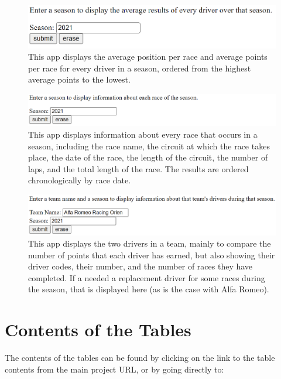 \documentclass{article} %
\begin{document}
\begin{figure}[H]
    \centering
    \includegraphics[scale=0.35]{6.PNG}
    \caption{This app displays the average position per race and average
    points per race for every driver in a season, ordered from the highest
    average points to the lowest.}
\end{figure}
\begin{figure}[H]
    \centering
    \includegraphics[scale=0.35]{7.PNG}
    \caption{This app displays information about every race that occurs
    in a season, including the race name, the circuit at which the race
    takes place, the date of the race, the length of the circuit, the
    number of laps, and the total length of the race. The results are
    ordered chronologically by race date.}
\end{figure}
\begin{figure}[H]
    \centering
    \includegraphics[scale=0.35]{8.PNG}
    \caption{This app displays the two drivers in a team, mainly to
    compare the number of points that each driver has earned, but also
    showing their driver codes, their number, and the number of races
    they have completed. If a needed a replacement driver for some races
    during the season, that is displayed here (as is the case with Alfa Romeo).}
\end{figure}


\section{Contents of the Tables}

The contents of the tables can be found by clicking on the link to the
table contents from the main project URL, or by going directly to:
\end{document}
